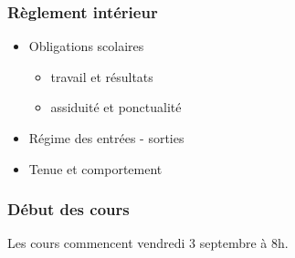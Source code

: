 \documentclass[svgnames,11pt]{beamer}
\begin{document}
\begin{frame}
    \frametitle{Règlement intérieur}

    \begin{itemize}
        \item<1-> Obligations scolaires
              \begin{itemize}
                  \item travail et résultats
                  \item assiduité et ponctualité
              \end{itemize}
        \item <2-> Régime des entrées - sorties
        \item <3-> Tenue et comportement
    \end{itemize}

\end{frame}
\begin{frame}
    \frametitle{Début des cours}

    \begin{aretenir}[]\centering
        {\Large     Les cours commencent vendredi 3 septembre à 8h.
        }    \end{aretenir}

\end{frame}
\end{document}
